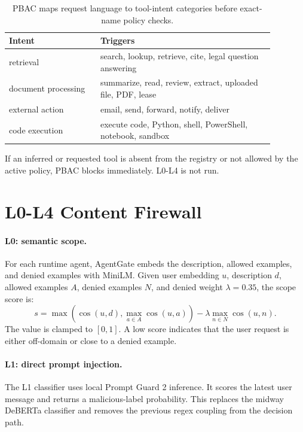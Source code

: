 \documentclass[11pt]{article}
\begin{document}
\begin{table}[t]
\small
\centering
\begin{tabular}{p{0.30\linewidth}p{0.58\linewidth}}
\toprule
\textbf{Intent} & \textbf{Triggers} \\
\midrule
retrieval & search, lookup, retrieve, cite, legal question answering \\
document processing & summarize, read, review, extract, uploaded file, PDF, lease \\
external action & email, send, forward, notify, deliver \\
code execution & execute code, Python, shell, PowerShell, notebook, sandbox \\
\bottomrule
\end{tabular}
\caption{PBAC maps request language to tool-intent categories before exact-name policy checks.}
\label{tab:intents}
\end{table}

If an inferred or requested tool is absent from the registry or not allowed by the active policy, PBAC blocks immediately. L0-L4 is not run.

\section{L0-L4 Content Firewall}

\paragraph{L0: semantic scope.}
For each runtime agent, AgentGate embeds the description, allowed examples, and denied examples with MiniLM. Given user embedding $u$, description $d$, allowed examples $A$, denied examples $N$, and denied weight $\lambda=0.35$, the scope score is:
\begin{equation}
s = \max(\cos(u,d), \max_{a \in A}\cos(u,a)) - \lambda \max_{n \in N}\cos(u,n).
\end{equation}
The value is clamped to $[0,1]$. A low score indicates that the user request is either off-domain or close to a denied example.

\paragraph{L1: direct prompt injection.}
The L1 classifier uses local Prompt Guard 2 inference. It scores the latest user message and returns a malicious-label probability. This replaces the midway DeBERTa classifier and removes the previous regex coupling from the decision path.
\end{document}
